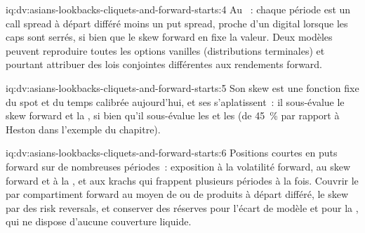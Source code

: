 \begin{solution}{iq:dv:asians-lookbacks-cliquets-and-forward-starts:4}
Au ~: chaque période est un call spread à départ différé moins un put spread, proche d'un digital lorsque les caps sont
serrés, si bien que le skew forward en fixe la valeur. Deux modèles peuvent reproduire toutes les options vanilles (distributions terminales) et pourtant attribuer
des lois conjointes différentes aux rendements forward.
\end{solution}

\begin{solution}{iq:dv:asians-lookbacks-cliquets-and-forward-starts:5}
Son skew est une fonction fixe du spot et du temps calibrée aujourd'hui, et ses  s'aplatissent~: il sous-évalue le skew forward
et la , si bien qu'il sous-évalue les  et les  (de 45~\% par rapport à Heston dans
l'exemple du chapitre).
\end{solution}

\begin{solution}{iq:dv:asians-lookbacks-cliquets-and-forward-starts:6}
Positions courtes en puts forward sur de nombreuses périodes~: exposition à la volatilité forward, au skew forward et à la , et aux krachs qui frappent plusieurs périodes à la fois. Couvrir le  par compartiment forward au moyen de  ou de produits à départ différé,
le skew par des risk reversals, et conserver des réserves pour l'écart de modèle et pour la , qui ne dispose
d'aucune couverture liquide.
\end{solution}
